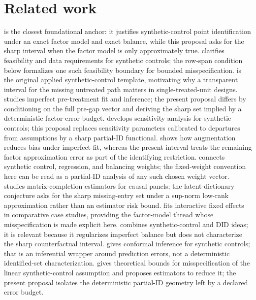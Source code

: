\documentclass[11pt]{article}
\theoremstyle{definition}
\theoremstyle{plain}
\theoremstyle{remark}
\begin{document}
\section{Related work}
\citet{AbadieDiamondHainmueller2010} is the closest foundational anchor: it justifies synthetic-control point identification under an exact factor model and exact balance, while this proposal asks for the sharp interval when the factor model is only approximately true. \citet{Abadie2021} clarifies feasibility and data requirements for synthetic controls; the row-span condition below formalizes one such feasibility boundary for bounded misspecification. \citet{AbadieGardeazabal2003} is the original applied synthetic-control template, motivating why a transparent interval for the missing untreated path matters in single-treated-unit designs. \citet{FermanPinto2021} studies imperfect pre-treatment fit and inference; the present proposal differs by conditioning on the full pre-gap vector and deriving the sharp set implied by a deterministic factor-error budget. \citet{FirpoPossebom2018} develops sensitivity analysis for synthetic controls; this proposal replaces sensitivity parameters calibrated to departures from assumptions by a sharp partial-ID functional. \citet{BenMichaelFellerRothstein2021} shows how augmentation reduces bias under imperfect fit, whereas the present interval treats the remaining factor approximation error as part of the identifying restriction. \citet{DoudchenkoImbens2016} connects synthetic control, regression, and balancing weights; the fixed-weight convention here can be read as a partial-ID analysis of any such chosen weight vector. \citet{AtheyBayatiDoudchenkoImbensKhosravi2021} studies matrix-completion estimators for causal panels; the latent-dictionary conjecture asks for the sharp missing-entry set under a sup-norm low-rank approximation rather than an estimator risk bound. \citet{Xu2017} fits interactive fixed effects in comparative case studies, providing the factor-model thread whose misspecification is made explicit here. \citet{ArkhangelskyAtheyHirshbergImbensWager2021} combines synthetic-control and DID ideas; it is relevant because it regularizes imperfect balance but does not characterize the sharp counterfactual interval. \citet{ChernozhukovWuthrichZhu2021} gives conformal inference for synthetic controls; that is an inferential wrapper around prediction errors, not a deterministic identified-set characterization. \citet{NazaretShiBlei2024} gives theoretical bounds for misspecification of the linear synthetic-control assumption and proposes estimators to reduce it; the present proposal isolates the deterministic partial-ID geometry left by a declared error budget.
\end{document}
